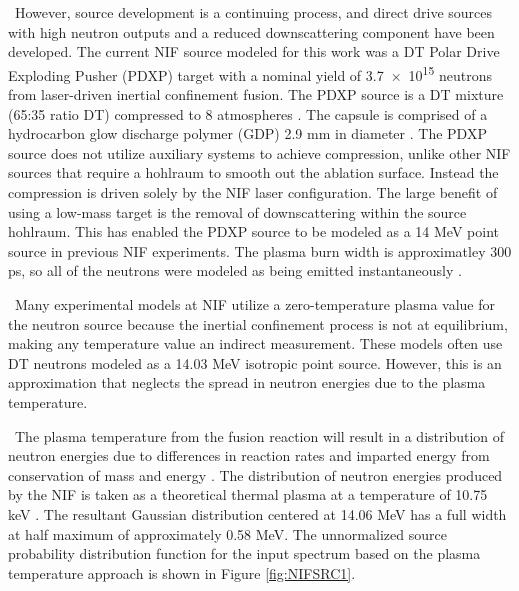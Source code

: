 \ However, source development is a continuing process, and direct drive sources with high neutron outputs and a reduced downscattering component have been developed. 
The current NIF source modeled for this work was a DT Polar Drive Exploding Pusher (PDXP) target with a nominal yield of \num{3.7e+15} neutrons from laser-driven inertial confinement fusion. 
The PDXP source is a DT mixture (65:35 ratio DT) compressed to 8 atmospheres \cite{Yeamans2017a}. 
The capsule is comprised of a hydrocarbon glow discharge polymer (GDP) 2.9 mm in diameter \cite{Chen2017}. 
The PDXP source does not utilize auxiliary systems to achieve compression, unlike other NIF sources that require a hohlraum to smooth out the ablation surface. 
Instead the compression is driven solely by the NIF laser configuration. 
The large benefit of using a low-mass target is the removal of downscattering within the source hohlraum. 
This has enabled the PDXP source to be modeled as a 14 MeV point source in previous NIF experiments. 
The plasma burn width is approximatley 300 ps, so all of the neutrons were modeled as being emitted instantaneously \cite{Yeamans2017a}.

\ Many experimental models at NIF utilize a zero-temperature plasma value for the neutron source because the inertial confinement process is not at equilibrium, making any temperature value an indirect measurement. 
These models often use DT neutrons modeled as a 14.03 MeV isotropic point source.
However, this is an approximation that neglects the spread in neutron energies due to the plasma temperature.

\ The plasma temperature from the fusion reaction will result in a distribution of neutron energies due to differences in reaction rates and imparted energy from conservation of mass and energy \cite{Brysk1973}. 
The distribution of neutron energies produced by the NIF is taken as a theoretical thermal plasma at a temperature of 10.75 keV \cite{Appelbe2014}. 
The resultant Gaussian distribution centered at 14.06 MeV has a full width at half maximum of approximately 0.58 MeV. 
The unnormalized source probability distribution function for the input spectrum based on the plasma temperature approach is shown in Figure \ref{fig:NIFSRC1}. 

